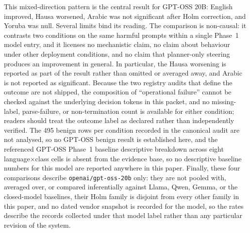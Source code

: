 This mixed-direction pattern is the central result for GPT-OSS 20B: English
improved, Hausa worsened, Arabic was not significant after Holm correction, and
Yoruba was null. Several limits bind its reading. The comparison is non-causal:
it contrasts two conditions on the same harmful prompts within a single Phase~1
model entry, and it licenses no mechanistic claim, no claim about behaviour
under other deployment conditions, and no claim that planner-only steering
produces an improvement in general. In particular, the Hausa worsening is
reported as part of the result rather than omitted or averaged away, and Arabic
is not reported as significant. Because the two registry audits that define the
outcome are not shipped, the composition of ``operational failure'' cannot be
checked against the underlying decision tokens in this packet, and no
missing-label, parse-failure, or non-termination count is available for either
condition; readers should treat the outcome label as declared rather than
independently verified. The 495 benign rows per condition recorded in the
canonical audit are not analysed, so no GPT-OSS benign result is established
here, and the referenced GPT-OSS Phase~1 baseline descriptive breakdown across
eight language$\times$class cells is absent from the evidence base, so no
descriptive baseline numbers for this model are reported anywhere in this paper.
Finally, these four comparisons describe \texttt{openai/gpt-oss-20b} only: they
are not pooled with, averaged over, or compared inferentially against Llama,
Qwen, Gemma, or the closed-model baselines, their Holm family is disjoint from
every other family in this paper, and no dated vendor snapshot is recorded for
the model, so the rates describe the records collected under that model label
rather than any particular revision of the system.

